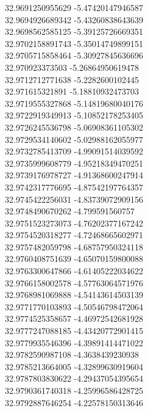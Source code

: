 {32.9691250955629	-5.47420147946587\\
32.9694926689342	-5.43260838643639\\
32.9698562585125	-5.39125726669351\\
32.9702158891743	-5.35014749899151\\
32.9705715858464	-5.30927845636696\\
32.970923373503	-5.26864950619478\\
32.9712712771638	-5.2282600102445\\
32.971615321891	-5.18810932473703\\
32.9719555327868	-5.14819680040176\\
32.9722919349913	-5.10852178253405\\
32.9726245536798	-5.06908361105302\\
32.9729534140602	-5.02988162055977\\
32.9732785413709	-4.99091514039592\\
32.9735999608779	-4.95218349470251\\
32.9739176978727	-4.91368600247914\\
32.9742317776695	-4.87542197764357\\
32.9745422256031	-4.83739072909156\\
32.9748490670262	-4.799591560757\\
32.9751523273073	-4.76202377167242\\
32.9754520318277	-4.72468665602971\\
32.9757482059798	-4.68757950324118\\
32.9760408751639	-4.65070159800088\\
32.9763300647866	-4.61405222034622\\
32.9766158002578	-4.57763064571976\\
32.9768981069888	-4.54143614503139\\
32.9771770103893	-4.50546798472064\\
32.9774525358657	-4.46972542681928\\
32.9777247088185	-4.43420772901415\\
32.9779935546396	-4.39891414471022\\
32.9782590987108	-4.3638439230938\\
32.9785213664005	-4.32899630919604\\
32.9787803830622	-4.29437054395654\\
32.9790361740318	-4.25996586428725\\
32.9792887646254	-4.22578150313646\\
}
